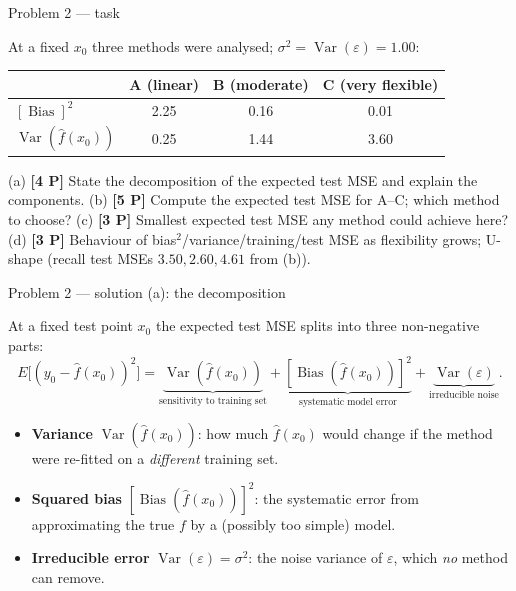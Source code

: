 \documentclass[aspectratio=169,11pt]{beamer}
\begin{document}
\begin{frame}{Problem 2 --- task}
  \begin{exercise}
    At a fixed $x_0$ three methods were analysed; $\sigma^2=\operatorname{Var}(\varepsilon)=1.00$:
    \begin{center}\scriptsize
    \begin{tabular}{lccc}
      \toprule
      & A (linear) & B (moderate) & C (very flexible)\\
      \midrule
      $[\operatorname{Bias}]^2$ & 2.25 & 0.16 & 0.01\\
      $\operatorname{Var}(\hat f(x_0))$ & 0.25 & 1.44 & 3.60\\
      \bottomrule
    \end{tabular}
    \end{center}
    (a) \textbf{[4 P]} State the decomposition of the expected test MSE and explain the components.
    (b) \textbf{[5 P]} Compute the expected test MSE for A--C; which method to choose?
    (c) \textbf{[3 P]} Smallest expected test MSE any method could achieve here?
    (d) \textbf{[3 P]} Behaviour of bias$^2$/variance/training/test MSE as flexibility grows; U-shape
        (recall test MSEs $3.50,2.60,4.61$ from (b)).
  \end{exercise}
\end{frame}

\begin{frame}{Problem 2 --- solution (a): the decomposition}
  \begin{solutionbox}
    At a fixed test point $x_0$ the expected test MSE splits into three non-negative parts:
    \[
      E\big[(y_0-\hat f(x_0))^2\big]
      =\underbrace{\operatorname{Var}(\hat f(x_0))}_{\text{sensitivity to training set}}
      +\underbrace{[\operatorname{Bias}(\hat f(x_0))]^2}_{\text{systematic model error}}
      +\underbrace{\operatorname{Var}(\varepsilon)}_{\text{irreducible noise}}.
    \]
    \begin{itemize}
      \item \textbf{Variance} $\operatorname{Var}(\hat f(x_0))$: how much $\hat f(x_0)$ would
        change if the method were re-fitted on a \emph{different} training set.
      \item \textbf{Squared bias} $[\operatorname{Bias}(\hat f(x_0))]^2$: the systematic error
        from approximating the true $f$ by a (possibly too simple) model.
      \item \textbf{Irreducible error} $\operatorname{Var}(\varepsilon)=\sigma^2$: the noise
        variance of $\varepsilon$, which \emph{no} method can remove.
    \end{itemize}
  \end{solutionbox}
\end{frame}
\end{document}
